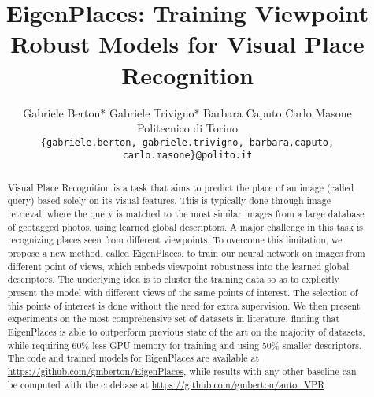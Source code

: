 \documentclass[10pt,twocolumn,letterpaper]{article}
\begin{document}
\title{EigenPlaces: Training Viewpoint Robust Models for Visual Place Recognition}


\author{Gabriele Berton*
\quad
Gabriele Trivigno*
\quad
Barbara Caputo
\quad
Carlo Masone\\
 Politecnico di Torino\\
{\tt\small \{gabriele.berton, gabriele.trivigno, barbara.caputo, carlo.masone\}@polito.it}\\
}


\maketitle
\ificcvfinal\thispagestyle{empty}\fi

\begin{abstract}
Visual Place Recognition is a task that aims to predict the place of an image (called query) based solely on its visual features.
This is typically done through image retrieval, where the query is matched to the most similar images from a large database of geotagged photos, using learned global descriptors.
A major challenge in this task is recognizing places seen from different viewpoints. To overcome this limitation, we propose a new method, called EigenPlaces, to train our neural network on images from different point of views, which embeds viewpoint robustness into the learned global descriptors. The underlying idea is to cluster the training data so as to explicitly present the model with different views of the same points of interest. The selection of this points of interest is done without the need for extra supervision.
We then present experiments on the most comprehensive set of datasets in literature, finding that EigenPlaces is able to outperform previous state of the art on the majority of datasets, while requiring 60\% less GPU memory for training and using 50\% smaller descriptors.
The code and trained models for EigenPlaces are available at {\small{\url{https://github.com/gmberton/EigenPlaces}}}, while results with any other baseline can be computed with the codebase at 
{\small{\url{https://github.com/gmberton/auto_VPR}}}.
\end{abstract}
\end{document}
